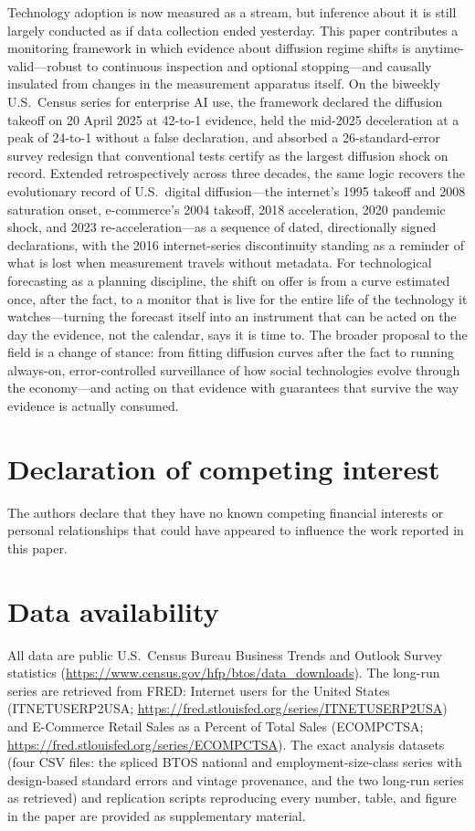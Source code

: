 \documentclass[review,authoryear,12pt]{elsarticle}
\begin{document}
Technology adoption is now measured as a stream, but inference about it is still largely conducted as if data collection ended yesterday. This paper contributes a monitoring framework in which evidence about diffusion regime shifts is anytime-valid---robust to continuous inspection and optional stopping---and causally insulated from changes in the measurement apparatus itself. On the biweekly U.S.\ Census series for enterprise AI use, the framework declared the diffusion takeoff on 20 April 2025 at 42-to-1 evidence, held the mid-2025 deceleration at a peak of 24-to-1 without a false declaration, and absorbed a 26-standard-error survey redesign that conventional tests certify as the largest diffusion shock on record. Extended retrospectively across three decades, the same logic recovers the evolutionary record of U.S.\ digital diffusion---the internet's 1995 takeoff and 2008 saturation onset, e-commerce's 2004 takeoff, 2018 acceleration, 2020 pandemic shock, and 2023 re-acceleration---as a sequence of dated, directionally signed declarations, with the 2016 internet-series discontinuity standing as a reminder of what is lost when measurement travels without metadata. For technological forecasting as a planning discipline, the shift on offer is from a curve estimated once, after the fact, to a monitor that is live for the entire life of the technology it watches---turning the forecast itself into an instrument that can be acted on the day the evidence, not the calendar, says it is time to. The broader proposal to the field is a change of stance: from fitting diffusion curves after the fact to running always-on, error-controlled surveillance of how social technologies evolve through the economy---and acting on that evidence with guarantees that survive the way evidence is actually consumed.

\section*{Declaration of competing interest}
The authors declare that they have no known competing financial interests or personal relationships that could have appeared to influence the work reported in this paper.

\section*{Data availability}
All data are public U.S.\ Census Bureau Business Trends and Outlook Survey statistics (\url{https://www.census.gov/hfp/btos/data_downloads}). The long-run series are retrieved from FRED: Internet users for the United States (ITNETUSERP2USA; \url{https://fred.stlouisfed.org/series/ITNETUSERP2USA}) and E-Commerce Retail Sales as a Percent of Total Sales (ECOMPCTSA; \url{https://fred.stlouisfed.org/series/ECOMPCTSA}). The exact analysis datasets (four CSV files: the spliced BTOS national and employment-size-class series with design-based standard errors and vintage provenance, and the two long-run series as retrieved) and replication scripts reproducing every number, table, and figure in the paper are provided as supplementary material.
\end{document}
